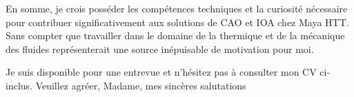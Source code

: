 En somme, je crois posséder les compétences techniques et la curiosité nécessaire pour contribuer significativement aux solutions de CAO et IOA chez Maya HTT. Sans compter que travailler dans le domaine de la thermique et de la mécanique des fluides représenterait une source inépuisable de motivation pour moi. 

Je suis disponible pour une entrevue et n’hésitez pas à consulter mon CV ci-inclus.
Veuillez agréer, Madame, mes sincères salutations

